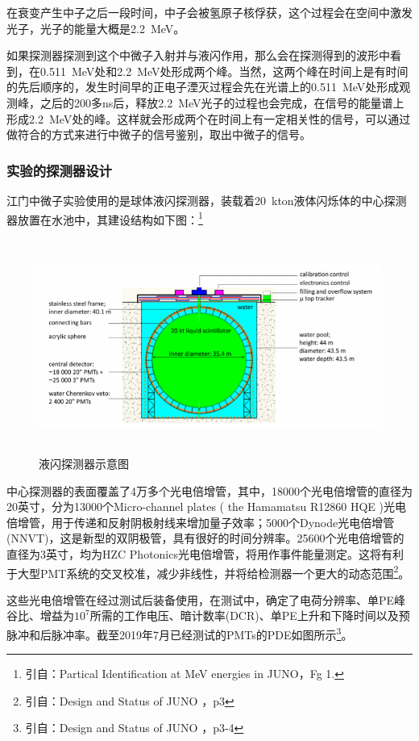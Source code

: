 \documentclass[10pt,a4paper]{article}
\begin{document}
在衰变产生中子之后一段时间，中子会被氢原子核俘获，这个过程会在空间中激发光子，光子的能量大概是\SI{2.2}{MeV}。

如果探测器探测到这个中微子入射并与液闪作用，那么会在探测得到的波形中看到，在\SI{0.511}{MeV}处和\SI{2.2}{MeV}处形成两个峰。当然，这两个峰在时间上是有时间的先后顺序的，发生时间早的正电子湮灭过程会先在光谱上的\SI{0.511}{MeV}处形成观测峰，之后的200多ns后，释放\SI{2.2}{MeV}光子的过程也会完成，在信号的能量谱上形成\SI{2.2}{MeV}处的峰。这样就会形成两个在时间上有一定相关性的信号，可以通过做符合的方式来进行中微子的信号鉴别，取出中微子的信号。

\subsubsection{实验的探测器设计}\label{sub:logicinter}

江门中微子实验使用的是球体液闪探测器，装载着\SI{20}{kton}液体闪烁体的中心探测器放置在水池中，其建设结构如下图：\footnote{引自：Partical Identification at MeV energies in JUNO，Fg 1.}

\begin{figure}[ht]
 \centering
 \includegraphics[height=7cm]{images/探测器示意图.png}
 \caption{液闪探测器示意图}
 \label{fig:singleblock}
\end{figure}

中心探测器的表面覆盖了4万多个光电倍增管，其中，18000个光电倍增管的直径为20英寸，分为13000个Micro-channel plates ( the Hamamatsu R12860 HQE )光电倍增管，用于传递和反射阴极射线来增加量子效率；5000个Dynode光电倍增管(NNVT)，这是新型的双阴极管，具有很好的时间分辨率。25600个光电倍增管的直径为3英寸，均为HZC Photonics光电倍增管，将用作事件能量测定。这将有利于大型PMT系统的交叉校准，减少非线性，并将给检测器一个更大的动态范围\footnote{引自：Design and Status of JUNO ，p3}。

这些光电倍增管在经过测试后装备使用，在测试中，确定了电荷分辨率、单PE峰谷比、增益为$10^7$所需的工作电压、暗计数率(DCR)、单PE上升和下降时间以及预脉冲和后脉冲率。截至2019年7月已经测试的PMTs的PDE如图所示\footnote{引自：Design and Status of JUNO ，p3-4}。
\end{document}
